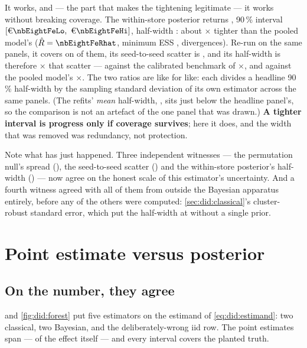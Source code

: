 It works, and --- the part that makes the tightening legitimate --- it works without breaking
coverage. The within-store posterior returns \eur{\nbEightFeAtt}, 90\,\% interval
$[\eur{\nbEightFeLo},\ \eur{\nbEightFeHi}]$, half-width \eur{\nbEightFeHalf}: about
\nbEightFeTighter$\times$ tighter than the pooled model's ($\hat R = \nbEightFeRhat$, minimum ESS
\nbEightFeEss, \nbEightFeDiv{} divergences). Re-run on the same \nbEightSeedN{} panels, it covers on
\nbEightFeCov{} of them, its seed-to-seed scatter is \eur{\nbEightFeSeedSd}, and its half-width is
therefore \nbEightFeHwOverScatter$\times$ that scatter --- against the calibrated benchmark of
\nbEightCalibratedRatio$\times$, and against the pooled model's \nbEightPooledOverScatter$\times$.
The two ratios are like for like: each divides a headline 90\,\% half-width by the sampling
standard deviation of its own estimator across the same \nbEightSeedN{} panels. (The refits'
\emph{mean} half-width, \eur{\nbEightFeSeedHalf}, sits just below the headline panel's, so the
comparison is not an artefact of the one panel that was drawn.)
\textbf{A tighter interval is progress only if coverage survives};
here it does, and the width that was removed was redundancy, not protection.

Note what has just happened. Three independent witnesses --- the permutation null's spread
(\eur{\nbEightPermSd}), the seed-to-seed scatter (\eur{\nbEightSeedSd}) and the within-store
posterior's half-width (\eur{\nbEightFeHalf}) --- now agree on the honest scale of this estimator's
uncertainty. And a fourth witness agreed with all of them from outside the Bayesian apparatus
entirely, before any of the others were computed: \cref{sec:did:classical}'s cluster-robust standard
error, which put the half-width at \eur{\nbEightAttClHalf} without a single prior.

\section{Point estimate versus posterior}
\label{sec:did:compare}




\subsection*{On the number, they agree}

 and \cref{fig:did:forest} put five estimators on the estimand of
\cref{eq:did:estimand}: two classical, two Bayesian, and the deliberately-wrong iid row. The point
estimates span \eur{\nbEightEstSpan} --- \pc{\nbEightEstSpanPct} of the effect itself --- and every
interval covers the planted truth.

